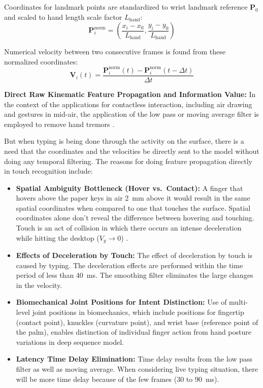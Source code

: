 Coordinates for landmark points are standardized to wrist landmark reference $\mathbf{P}_0$ and scaled to hand length scale factor $L_{\text{hand}}$:
\begin{equation}
\mathbf{P}_i^{\text{norm}} = \left( \frac{x_i - x_0}{L_{\text{hand}}}, \frac{y_i - y_0}{L_{\text{hand}}} \right)
\label{eq:normalized_landmark_def}
\end{equation}

Numerical velocity between two consecutive frames is found from these normalized coordinates:
\begin{equation}
\mathbf{V}_i(t) = \frac{\mathbf{P}_i^{\text{norm}}(t) - \mathbf{P}_i^{\text{norm}}(t - \Delta t)}{\Delta t}
\label{eq:joint_velocity_def}
\end{equation}



\textbf{Direct Raw Kinematic Feature Propagation and Information Value:} 
In the context of the applications for contactless interaction, including air drawing and gestures in mid-air, the application of the low pass or moving average filter is employed to remove hand tremors \cite{Kumar2026Hybrid}.

But when typing is being done through the activity on the surface, there is a need that the coordinates and the velocities be directly sent to the model without doing any temporal filtering. The reasons for doing feature propagation directly in touch recognition include:
\begin{itemize}
    \item \textbf{Spatial Ambiguity Bottleneck (Hover vs.\ Contact):} A finger that hovers above the paper keys in air 2~mm above it would result in the same spatial coordinates when compared to one that touches the surface. Spatial coordinates alone don't reveal the difference between hovering and touching. Touch is an act of collision in which there occurs an intense deceleration while hitting the desktop ($V_y \to 0$) \cite{Srivastava2012RealTime, MacRitchie2015Integrating}.
    \item \textbf{Effects of Deceleration by Touch:} The effect of deceleration by touch is caused by typing. The deceleration effects are performed within the time period of less than 40~ms. The smoothing filter eliminates the large changes in the velocity.
    \item \textbf{Biomechanical Joint Positions for Intent Distinction:} Use of multi-level joint positions in biomechanics, which include positions for fingertip (contact point), knuckles (curvature point), and wrist base (reference point of the palm), enables distinction of individual finger action from hand posture variations in deep sequence model.
    \item \textbf{Latency Time Delay Elimination:} Time delay results from the low pass filter as well as moving average. When considering live typing situation, there will be more time delay because of the few frames (30 to 90~ms).
\end{itemize}

